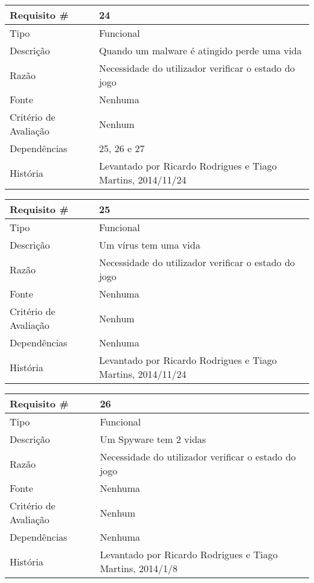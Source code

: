 \begin{tabular} {|l|p{8cm}|} 
\hline
Requisito \# & 24 \\
\hline
Tipo & Funcional \\
\hline
Descrição & Quando um malware é atingido perde uma vida \\
\hline
Razão & Necessidade do utilizador verificar o estado do jogo \\
\hline
Fonte & Nenhuma \\
\hline
Critério de Avaliação & Nenhum \\
\hline
Dependências & 25, 26 e 27 \\
\hline
História & Levantado por Ricardo Rodrigues e Tiago Martins, 2014/11/24 \\
\hline
\end{tabular}

\begin{tabular} {|l|p{8cm}|} 
\hline
Requisito \# & 25 \\
\hline
Tipo & Funcional \\
\hline
Descrição & Um vírus tem uma vida \\
\hline
Razão & Necessidade do utilizador verificar o estado do jogo \\
\hline
Fonte & Nenhuma \\
\hline
Critério de Avaliação & Nenhum \\
\hline
Dependências & Nenhuma \\
\hline
História & Levantado por Ricardo Rodrigues e Tiago Martins, 2014/11/24 \\
\hline
\end{tabular}

\begin{tabular} {|l|p{8cm}|} 
\hline
Requisito \# & 26 \\
\hline
Tipo & Funcional \\
\hline
Descrição & Um Spyware tem 2 vidas \\
\hline
Razão & Necessidade do utilizador verificar o estado do jogo \\
\hline
Fonte & Nenhuma \\
\hline
Critério de Avaliação & Nenhum \\
\hline
Dependências & Nenhuma \\
\hline
História & Levantado por Ricardo Rodrigues e Tiago Martins, 2014/1/8 \\
\hline
\end{tabular}

